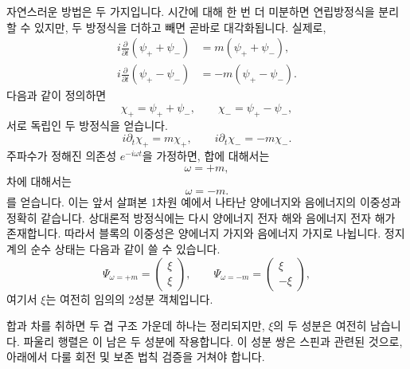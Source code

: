 자연스러운 방법은 두 가지입니다. 시간에 대해 한 번 더 미분하면 연립방정식을 분리할 수 있지만, 두 방정식을 더하고 빼면 곧바로 대각화됩니다. 실제로,
\begin{align}
i\frac{\partial}{\partial t}(\psi_++\psi_-)
&=m(\psi_++\psi_-),\\
i\frac{\partial}{\partial t}(\psi_+-\psi_-)
&=-m(\psi_+-\psi_-).
\end{align}
다음과 같이 정의하면
\begin{equation}
\chi_+=\psi_++\psi_-,
\qquad
\chi_-=\psi_+-\psi_-,
\end{equation}
서로 독립인 두 방정식을 얻습니다.
\begin{equation}
i\partial_t\chi_+=m\chi_+,
\qquad
i\partial_t\chi_-=-m\chi_-.
\end{equation}
주파수가 정해진 의존성 \(e^{-i\omega t}\)을 가정하면, 합에 대해서는
\begin{equation}
\omega=+m,
\end{equation}
차에 대해서는
\begin{equation}
\omega=-m.
\end{equation}
를 얻습니다. 이는 앞서 살펴본 1차원 예에서 나타난 양에너지와 음에너지의 이중성과 정확히 같습니다. 상대론적 방정식에는 다시 양에너지 전자 해와 음에너지 전자 해가 존재합니다. 따라서 블록의 이중성은 양에너지 가지와 음에너지 가지로 나뉩니다. 정지계의 순수 상태는 다음과 같이 쓸 수 있습니다.
\begin{equation}
\Psi_{\omega=+m}=
\begin{pmatrix}
\xi\\
\xi
\end{pmatrix},
\qquad
\Psi_{\omega=-m}=
\begin{pmatrix}
\xi\\
-\xi
\end{pmatrix},
\end{equation}
여기서 \(\xi\)는 여전히 임의의 2성분 객체입니다.

합과 차를 취하면 두 겹 구조 가운데 하나는 정리되지만, \(\xi\)의 두 성분은 여전히 남습니다. 파울리 행렬은 이 남은 두 성분에 작용합니다. 이 성분 쌍은 스핀과 관련된 것으로, 아래에서 다룰 회전 및 보존 법칙 검증을 거쳐야 합니다.

\begin{classroomqa}
\end{classroomqa}

